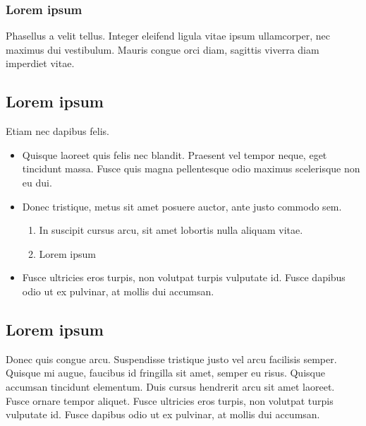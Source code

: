 \subsubsection{Lorem ipsum}

Phasellus a velit tellus. Integer eleifend ligula vitae ipsum ullamcorper, nec maximus dui vestibulum. Mauris congue orci diam, sagittis viverra diam imperdiet vitae.

\subsection{Lorem ipsum}

Etiam nec dapibus felis.

\begin{itemize}
\item Quisque laoreet quis felis nec blandit. Praesent vel tempor neque, eget tincidunt massa. Fusce quis magna pellentesque odio maximus scelerisque non eu dui.
\item Donec tristique, metus sit amet posuere auctor, ante justo commodo sem.
\begin{enumerate}
\item In suscipit cursus arcu, sit amet lobortis nulla aliquam vitae.
\item Lorem ipsum
\end{enumerate}
\item Fusce ultricies eros turpis, non volutpat turpis vulputate id. Fusce dapibus odio ut ex pulvinar, at mollis dui accumsan.
\end{itemize}

\subsection{Lorem ipsum}

Donec quis congue arcu. Suspendisse tristique justo vel arcu facilisis semper. Quisque mi augue, faucibus id fringilla sit amet, semper eu risus. Quisque accumsan tincidunt elementum. Duis cursus hendrerit arcu sit amet laoreet. Fusce ornare tempor aliquet. Fusce ultricies eros turpis, non volutpat turpis vulputate id. Fusce dapibus odio ut ex pulvinar, at mollis dui accumsan. 